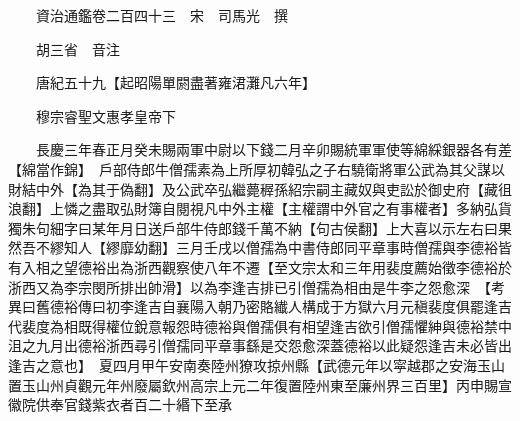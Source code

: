 










 


 
 


 

  
  
  
  
  





  
  
  
  
  
 
  

  

  
  
  



  

 
 

  
   




  

  
  


  　　資治通鑑卷二百四十三　宋　司馬光　撰

　　胡三省　音注

　　唐紀五十九【起昭陽單閼盡著雍涒灘凡六年】

　　穆宗睿聖文惠孝皇帝下

　　長慶三年春正月癸未賜兩軍中尉以下錢二月辛卯賜統軍軍使等綿綵銀器各有差【綿當作錦】　戶部侍郎牛僧孺素為上所厚初韓弘之子右驍衛將軍公武為其父謀以財結中外【為其于偽翻】及公武卒弘繼薨稺孫紹宗嗣主藏奴與吏訟於御史府【藏徂浪翻】上憐之盡取弘財簿自閱視凡中外主權【主權謂中外官之有事權者】多納弘貨獨朱句細字曰某年月日送戶部牛侍郎錢千萬不納【句古侯翻】上大喜以示左右曰果然吾不繆知人【繆靡幼翻】三月壬戌以僧孺為中書侍郎同平章事時僧孺與李德裕皆有入相之望德裕出為浙西觀察使八年不遷【至文宗太和三年用裴度薦始徵李德裕於浙西又為李宗閔所排出帥滑】以為李逢吉排已引僧孺為相由是牛李之怨愈深　【考異曰舊德裕傳曰初李逢吉自襄陽入朝乃密賂纎人構成于方獄六月元稹裴度俱罷逢吉代裴度為相既得權位銳意報怨時德裕與僧孺俱有相望逢吉欲引僧孺懼紳與德裕禁中沮之九月出德裕浙西尋引僧孺同平章事繇是交怨愈深蓋德裕以此疑怨逢吉未必皆出逢吉之意也】　夏四月甲午安南奏陸州獠攻掠州縣【武德元年以寜越郡之安海玉山置玉山州貞觀元年州廢屬欽州高宗上元二年復置陸州東至廉州界三百里】丙申賜宣徽院供奉官錢紫衣者百二十緡下至承

